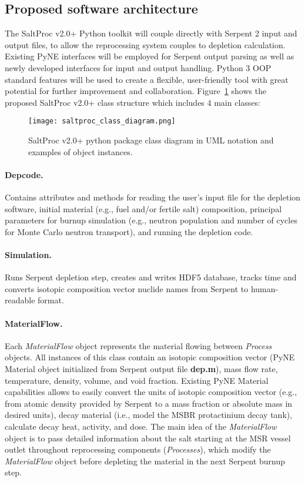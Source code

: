 \subsection{Proposed software architecture}
The SaltProc v2.0+ Python toolkit will couple directly with Serpent 2 input 
and output files, to allow the reprocessing system couples to depletion 
calculation. Existing PyNE interfaces will be employed for Serpent output 
parsing as well as newly developed interfaces for input and output handling. 
Python 3 \gls{OOP} standard features will be used to create a flexible, 
user-friendly tool with great potential for further improvement and 
collaboration. Figure~\ref{fig:saltproc_class} shows the proposed SaltProc 
v2.0+ class structure which includes 4 main classes:
\begin{figure}[ht!] %
	\texttt{[image: saltproc\_class\_diagram.png]}
	\vspace{-0.15in}
	\caption{SaltProc v2.0+ python package class diagram in UML notation 
		and examples of object instances.}
	\label{fig:saltproc_class}
\end{figure}
\paragraph{Depcode.}Contains attributes and methods for reading the user's 
input file for the depletion software, initial material (e.g., fuel and/or 
fertile salt) composition, principal parameters for burnup simulation (e.g., 
neutron population and number of cycles for Monte Carlo neutron transport), 
and running the depletion code.
\paragraph{Simulation.}Runs Serpent depletion step, creates and writes HDF5 
database, tracks time and converts isotopic composition vector nuclide names 
from Serpent to human-readable format.
\paragraph{MaterialFlow.}Each \textit{MaterialFlow} object 
represents the material flowing between \textit{Process} objects. 
All instances of this class contain an isotopic composition vector 
(PyNE Material object initialized from Serpent output file \textbf{dep.m}), 
mass flow rate, temperature, density, volume, and void fraction. Existing PyNE 
Material capabilities allows to easily convert the units of isotopic  
composition vector (e.g., from atomic density provided by Serpent to 
a mass fraction or absolute mass in desired units), decay material 
(i.e., model the \gls{MSBR} protactinium decay tank), calculate 
decay heat, activity, and dose. The main idea of the \textit{MaterialFlow} 
object is to pass detailed information about the salt starting at the 
\gls{MSR} vessel outlet throughout reprocessing components 
(\textit{Processes}), which modify the \textit{MaterialFlow} 
object before depleting the material in the next Serpent burnup step.
